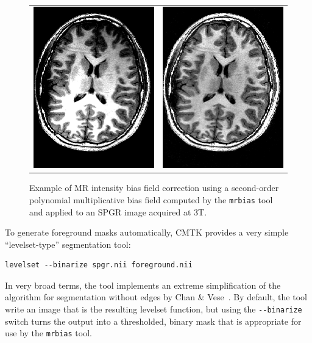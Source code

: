\documentclass{InsightArticle}
\begin{document}
\begin{figure}[tbp]
\begin{center}
\begin{tabular}{cc}
\includegraphics[width=.3\linewidth]{img/mrbias_orig}&
\includegraphics[width=.3\linewidth]{img/mrbias_corr}
\end{tabular}
\end{center}
\caption{Example of MR intensity bias field correction using a second-order
polynomial multiplicative bias field computed by the {\tt mrbias} tool and
applied to an SPGR image acquired at 3T.}
\label{fig:Mrbias}
\end{figure}

To generate foreground masks automatically, CMTK provides a very simple
``levelset-type'' segmentation tool:
\begin{verbatim}
levelset --binarize spgr.nii foreground.nii
\end{verbatim}
In very broad terms, the tool implements an extreme simplification of the
algorithm for segmentation without edges by Chan \&
Vese~\cite{ChanVese:2001}. By default, the tool write an image that is the
resulting levelset function, but using the \verb|--binarize| switch turns the
output into a thresholded, binary mask that is appropriate for use by the
\verb|mrbias| tool.
\end{document}
